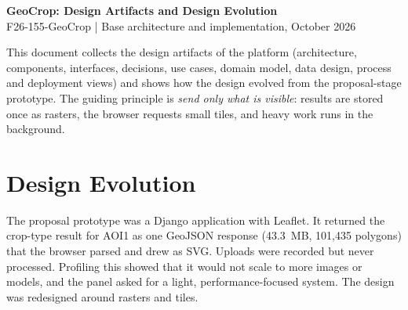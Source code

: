 \documentclass[11pt,a4paper]{article}
\begin{document}
{\LARGE\bfseries GeoCrop: Design Artifacts and Design Evolution}\\[3pt]
{\large F26-155-GeoCrop \;|\; Base architecture and implementation, October 2026}\par\vspace{4pt}
\noindent This document collects the design artifacts of the platform (architecture, components, interfaces,
decisions, use cases, domain model, data design, process and deployment views) and shows how the
design evolved from the proposal-stage prototype. The guiding principle is \emph{send only what is visible}:
results are stored once as rasters, the browser requests small tiles, and heavy work runs in the background.

\section{Design Evolution}
The proposal prototype was a Django application with Leaflet. It returned the crop-type result for
AOI1 as one GeoJSON response (43.3~MB, 101,435 polygons) that the browser parsed and drew as SVG.
Uploads were recorded but never processed. Profiling this showed that it would not scale to more images
or models, and the panel asked for a light, performance-focused system. The design was redesigned
around rasters and tiles.
\end{document}
